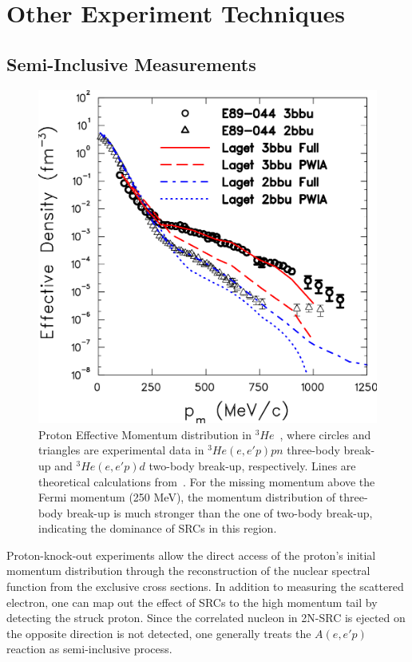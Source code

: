 \section{Other Experiment Techniques}
\subsection{Semi-Inclusive Measurements}
\begin{figure}[!ht]
  \begin{center}
    \includegraphics[type=pdf,ext=.pdf,read=.pdf,width=0.60\linewidth]{./figures/physics/10yrSRC_fig3}
    \caption[Proton Effective Momentum distribution in $^{3}He$.]{\footnotesize{Proton Effective Momentum distribution in $^{3}He$~\cite{PhysRevLett.94.082305}, where circles and triangles are experimental data in $^{3}He(e,e'p)pn$ three-body break-up and $^{3}He(e,e'p)d$ two-body break-up, respectively. Lines are theoretical calculations from~\cite{Laget200549}. For the missing momentum above the Fermi momentum (250 MeV), the momentum distribution of three-body break-up is much stronger than the one of two-body break-up, indicating the dominance of SRCs in this region.}}
    \label{10yrSRC_fig3}
  \end{center}
\end{figure} 
Proton-knock-out experiments allow the direct access of the proton's initial momentum distribution through the reconstruction of the nuclear spectral function from the exclusive cross sections. In addition to measuring the scattered electron, one can map out the effect of SRCs to the high momentum tail by detecting the struck proton. Since the correlated nucleon in 2N-SRC is ejected on the opposite direction is not detected, one generally treats the $A(e,e'p)$ reaction as semi-inclusive process. 

